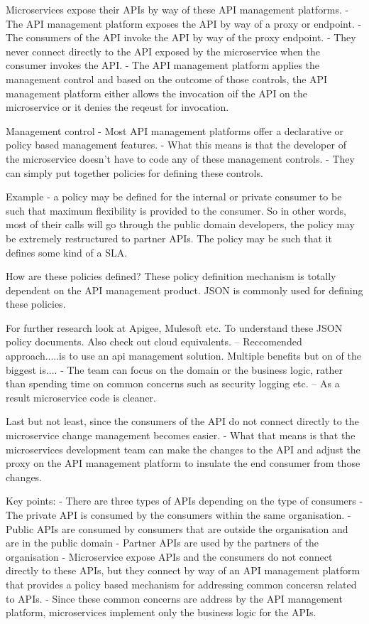 \documentclass[a4paper, 11pt]{book}
\begin{document}
    Microservices expose their APIs by way of these API management platforms.
    - The API management platform exposes the API by way of a proxy or endpoint.
    - The consumers of the API invoke the API by way of the proxy endpoint.
    - They never connect directly to the API exposed by the microservice when the consumer invokes the API.
    - The API management platform applies the management control and based on the outcome of those controls, the API management platform either allows the invocation oif the API on the microservice or it denies the reqeust for invocation.

    Management control
    - Most API management platforms offer a declarative or policy based management features.
    - What this means is that the developer of the microservice doesn't have to code any of these management controls.
    - They can simply put together policies for defining these controls.

    Example - a policy may be defined for the internal or private consumer to be such that maximum flexibility is provided to the consumer.
    So in other words, most of their calls will go through the public domain developers, the policy may be extremely restructured to partner APIs.
    The policy may be such that it defines some kind of a SLA.

    How are these policies defined?
    These policy definition mechanism is totally dependent on the API management product.
    JSON is commonly used for defining these policies.

    For further research look at Apigee, Mulesoft etc.
    To understand these JSON policy documents. Also check out cloud equivalents.
    -- Reccomended approach.....is to use an api management solution.
    Multiple benefits but on of the biggest is....
    - The team can focus on the domain or the business logic, rather than spending time on common concerns such as security logging etc.
    -- As a result microservice code is cleaner.

    Last but not least, since the consumers of the API do not connect directly to the microservice change management becomes easier.
    - What that means is that the microservices development team can make the changes to the API and adjust the proxy on the API management platform to insulate the end consumer from those changes.

    Key points:
    - There are three types of APIs depending on the type of consumers
    - The private API is consumed by the consumers within the same organisation.
    - Public APIs are consumed by consumers that are outside the organisation and are in the public domain
    - Partner APIs are used by the partners of the organisation
    - Microservice expose APIs and the consumers do not connect directly to these APIs, but they connect by way of an API management platform that provides a policy based mechanism for addressing common concersn related to APIs.
    - Since these common concerns are address by the API management platform, microservices implement only the business logic for the APIs.
\end{document}
